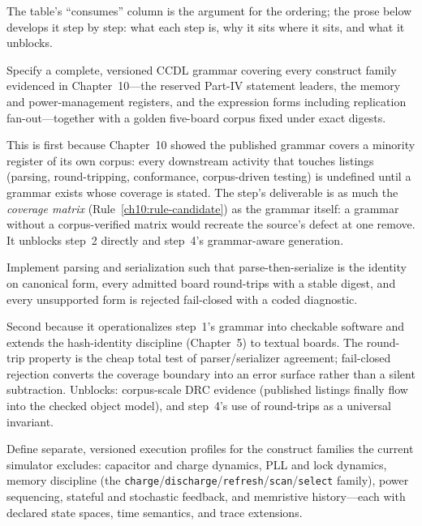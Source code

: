 The table's ``consumes'' column is the argument for the ordering; the prose below develops it step by step: what each step is, why it sits where it sits, and what it unblocks.

\begin{protocol}\label{ch12:step1}
Specify a complete, versioned CCDL grammar covering every construct family evidenced in Chapter~10---the reserved Part-IV statement leaders, the memory and power-management registers, and the expression forms including replication fan-out---together with a golden five-board corpus fixed under exact digests.
\end{protocol}

This is first because Chapter~10 showed the published grammar covers a minority register of its own corpus: every downstream activity that touches listings (parsing, round-tripping, conformance, corpus-driven testing) is undefined until a grammar exists whose coverage is stated. The step's deliverable is as much the \emph{coverage matrix} (Rule~\ref{ch10:rule-candidate}) as the grammar itself: a grammar without a corpus-verified matrix would recreate the source's defect at one remove. It unblocks step~2 directly and step~4's grammar-aware generation.

\begin{protocol}\label{ch12:step2}
Implement parsing and serialization such that parse-then-serialize is the identity on canonical form, every admitted board round-trips with a stable digest, and every unsupported form is rejected fail-closed with a coded diagnostic.
\end{protocol}

Second because it operationalizes step~1's grammar into checkable software and extends the hash-identity discipline (Chapter~5) to textual boards. The round-trip property is the cheap total test of parser/serializer agreement; fail-closed rejection converts the coverage boundary into an error surface rather than a silent subtraction. Unblocks: corpus-scale DRC evidence (published listings finally flow into the checked object model), and step~4's use of round-trips as a universal invariant.

\begin{protocol}\label{ch12:step3}
Define separate, versioned execution profiles for the construct families the current simulator excludes: capacitor and charge dynamics, PLL and lock dynamics, memory discipline (the \texttt{charge}/\texttt{discharge}/\texttt{refresh}/\texttt{scan}/\texttt{select} family), power sequencing, stateful and stochastic feedback, and memristive history---each with declared state spaces, time semantics, and trace extensions.
\end{protocol}

